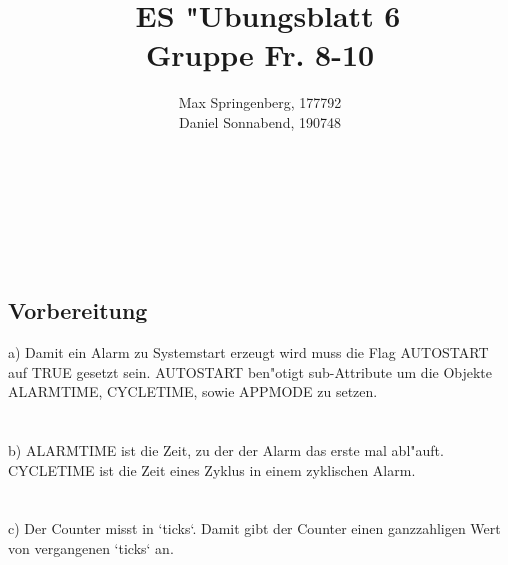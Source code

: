 \documentclass{article}
\author{Max Springenberg, 177792\\
        Daniel Sonnabend, 190748}
\title{\
    ES "Ubungsblatt 6\\
    Gruppe Fr. 8-10
    }
\date{}
\newcommand{\gap}{\ \\ \\}
\begin{document}
\maketitle
\\
\gap
\\
\subsection{Vorbereitung}
a) Damit ein Alarm zu Systemstart erzeugt wird muss die Flag AUTOSTART auf TRUE
    gesetzt sein.
    AUTOSTART ben"otigt sub-Attribute um die Objekte 
    ALARMTIME, CYCLETIME, sowie APPMODE zu setzen.\\
\gap
b) ALARMTIME ist die Zeit, zu der der Alarm das erste mal abl"auft.
    CYCLETIME ist die Zeit eines  Zyklus in einem zyklischen Alarm.\\
\gap
c) Der Counter misst in `ticks`.
    Damit gibt der Counter einen ganzzahligen Wert von vergangenen `ticks` an.\\
\end{document}
